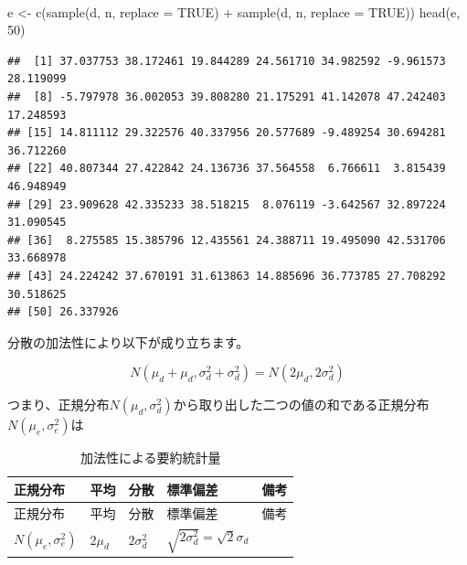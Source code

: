 \documentclass[a4paper]{tufte-handout}
\newenvironment{Shaded}{}{}
\newcommand{\AttributeTok}[1]{\textcolor[rgb]{0.49,0.56,0.16}{#1}}
\newcommand{\ConstantTok}[1]{\textcolor[rgb]{0.53,0.00,0.00}{#1}}
\newcommand{\DecValTok}[1]{\textcolor[rgb]{0.25,0.63,0.44}{#1}}
\newcommand{\FunctionTok}[1]{\textcolor[rgb]{0.02,0.16,0.49}{#1}}
\newcommand{\NormalTok}[1]{#1}
\newcommand{\OtherTok}[1]{\textcolor[rgb]{0.00,0.44,0.13}{#1}}
\newcommand{\SpecialCharTok}[1]{\textcolor[rgb]{0.25,0.44,0.63}{#1}}
\begin{document}
　

\begin{Shaded}
\begin{Highlighting}[numbers=left,,]
\NormalTok{e }\OtherTok{\textless{}{-}} \FunctionTok{c}\NormalTok{(}\FunctionTok{sample}\NormalTok{(d, n, }\AttributeTok{replace =} \ConstantTok{TRUE}\NormalTok{) }\SpecialCharTok{+} \FunctionTok{sample}\NormalTok{(d, n, }\AttributeTok{replace =} \ConstantTok{TRUE}\NormalTok{))}
\FunctionTok{head}\NormalTok{(e, }\DecValTok{50}\NormalTok{)}
\end{Highlighting}
\end{Shaded}

\begin{verbatim}
##  [1] 37.037753 38.172461 19.844289 24.561710 34.982592 -9.961573 28.119099
##  [8] -5.797978 36.002053 39.808280 21.175291 41.142078 47.242403 17.248593
## [15] 14.811112 29.322576 40.337956 20.577689 -9.489254 30.694281 36.712260
## [22] 40.807344 27.422842 24.136736 37.564558  6.766611  3.815439 46.948949
## [29] 23.909628 42.335233 38.518215  8.076119 -3.642567 32.897224 31.090545
## [36]  8.275585 15.385796 12.435561 24.388711 19.495090 42.531706 33.668978
## [43] 24.224242 37.670191 31.613863 14.885696 36.773785 27.708292 30.518625
## [50] 26.337926
\end{verbatim}

\newpage

分散の加法性により以下が成り立ちます。

\[N(\mu_d + \mu_d, \sigma^2_d + \sigma^2_d) = N(2\mu_d, 2\sigma^2_d)\]

つまり、正規分布\(N(\mu_d, \sigma^2_d)\)から取り出した二つの値の和である正規分布\(N(\mu_e, \sigma^2_e)\)は

\begin{longtable}[]{@{}
  >{\raggedright\arraybackslash}p{}
  >{\centering\arraybackslash}p{}
  >{\centering\arraybackslash}p{}
  >{\centering\arraybackslash}p{}
  >{\raggedright\arraybackslash}p{}@{}}
\caption{加法性による要約統計量}\tabularnewline
\toprule
正規分布 & 平均 & 分散 & 標準偏差 & 備考 \\
\midrule
\endfirsthead
\toprule
正規分布 & 平均 & 分散 & 標準偏差 & 備考 \\
\midrule
\endhead
\(N(\mu_e, \sigma^2_e)\) & \(2 \mu_d\) & \(2 \sigma^2_d\) &
\(\sqrt{2 \sigma^2_d} = \sqrt{2}\sigma_d\) & \\
\bottomrule
\end{longtable}
\end{document}
